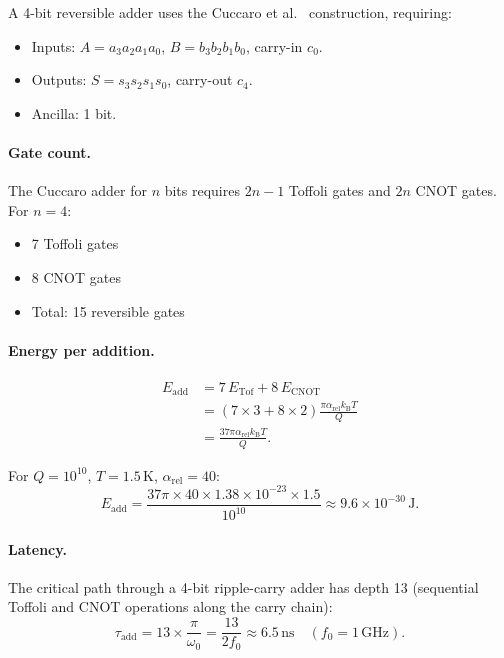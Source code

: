 \documentclass[11pt,twocolumn]{article}
\theoremstyle{definition}
\theoremstyle{remark}
\newcommand{\kB}{k_{\mathrm{B}}}
\begin{document}
A 4-bit reversible adder uses the Cuccaro et
al.~\cite{Cuccaro2004} construction, requiring:
\begin{itemize}
\item Inputs: $A = a_3 a_2 a_1 a_0$, $B = b_3 b_2 b_1 b_0$, carry-in $c_0$.
\item Outputs: $S = s_3 s_2 s_1 s_0$, carry-out $c_4$.
\item Ancilla: 1 bit.
\end{itemize}

\paragraph{Gate count.} The Cuccaro adder for $n$ bits requires $2n - 1$
Toffoli gates and $2n$ CNOT gates. For $n = 4$:
\begin{itemize}
\item 7 Toffoli gates
\item 8 CNOT gates
\item Total: 15 reversible gates
\end{itemize}

\paragraph{Energy per addition.}
\begin{align}
E_{\mathrm{add}} &= 7\,E_{\mathrm{Tof}} + 8\,E_{\mathrm{CNOT}} \nonumber\\
&= (7\times 3 + 8\times 2)\frac{\pi\alpha_{\mathrm{rel}}\kB T}{Q} \nonumber\\
&= \frac{37\pi\alpha_{\mathrm{rel}}\kB T}{Q}.
\label{eq:E_add}
\end{align}

For $Q = 10^{10}$, $T = 1.5\,\mathrm{K}$, $\alpha_{\mathrm{rel}} = 40$:
\begin{equation}
E_{\mathrm{add}} = \frac{37\pi \times 40 \times 1.38\times 10^{-23} \times 1.5}{10^{10}}
\approx 9.6\times 10^{-30}\,\mathrm{J}.
\end{equation}

\paragraph{Latency.}
The critical path through a 4-bit ripple-carry adder has depth 13
(sequential Toffoli and CNOT operations along the carry chain):
\begin{equation}
\tau_{\mathrm{add}} = 13 \times \frac{\pi}{\omega_0}
= \frac{13}{2f_0} \approx 6.5\,\mathrm{ns} \quad (f_0 = 1\,\mathrm{GHz}).
\end{equation}
\end{document}
